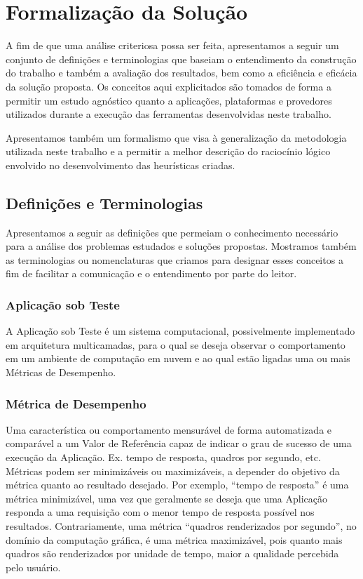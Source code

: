 \chapter{Formalização da Solução}
\label{chap:formalizacao}
A fim de que uma análise criteriosa possa ser feita, apresentamos a seguir um 
conjunto de definições e terminologias que baseiam o entendimento da 
construção do trabalho e também a avaliação dos resultados, bem como a eficiência 
e eficácia da solução proposta. Os conceitos aqui explicitados são tomados de 
forma a permitir um estudo agnóstico quanto a aplicações, plataformas e provedores
utilizados durante a execução das ferramentas desenvolvidas neste trabalho.

Apresentamos também um formalismo que visa à generalização da metodologia 
utilizada neste trabalho e a permitir a melhor descrição do raciocínio lógico 
envolvido no desenvolvimento das heurísticas criadas.

\section{Definições e Terminologias}
Apresentamos a seguir as definições que permeiam o conhecimento necessário para 
a análise dos problemas estudados e soluções propostas. Mostramos também as 
terminologias ou nomenclaturas que criamos para designar esses conceitos a fim 
de facilitar a comunicação e o entendimento por parte do leitor.

\subsection{Aplicação sob Teste}
A Aplicação sob Teste é um sistema computacional, possivelmente implementado em 
arquitetura multicamadas, para o qual se deseja observar o comportamento em um 
ambiente de computação em nuvem e ao qual estão ligadas uma ou mais Métricas de 
Desempenho.

\subsection{Métrica de Desempenho}
Uma característica ou comportamento mensurável de forma automatizada e 
comparável a um Valor de Referência capaz de indicar o grau de sucesso de uma 
execução da Aplicação. Ex. tempo de resposta, quadros por segundo, etc. Métricas 
podem ser minimizáveis ou maximizáveis, a depender do objetivo da métrica quanto 
ao resultado desejado. Por exemplo, “tempo de resposta” é uma métrica 
minimizável, uma vez que geralmente se deseja que uma Aplicação responda a uma 
requisição com o menor tempo de resposta possível nos resultados. Contrariamente, 
uma métrica “quadros renderizados por segundo”, no domínio da computação gráfica, 
é uma métrica maximizável, pois quanto mais quadros são renderizados por unidade 
de tempo, maior a qualidade percebida pelo usuário.

